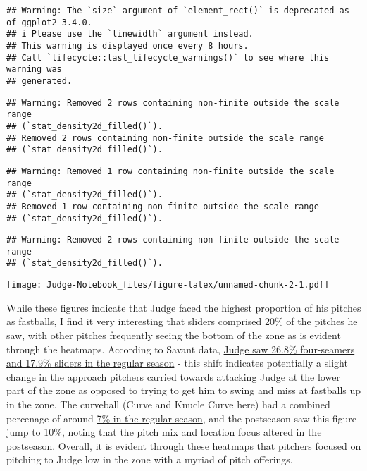 \documentclass[
]{article}
\begin{document}
\begin{verbatim}
## Warning: The `size` argument of `element_rect()` is deprecated as of ggplot2 3.4.0.
## i Please use the `linewidth` argument instead.
## This warning is displayed once every 8 hours.
## Call `lifecycle::last_lifecycle_warnings()` to see where this warning was
## generated.
\end{verbatim}

\begin{verbatim}
## Warning: Removed 2 rows containing non-finite outside the scale range
## (`stat_density2d_filled()`).
## Removed 2 rows containing non-finite outside the scale range
## (`stat_density2d_filled()`).
\end{verbatim}

\begin{verbatim}
## Warning: Removed 1 row containing non-finite outside the scale range
## (`stat_density2d_filled()`).
## Removed 1 row containing non-finite outside the scale range
## (`stat_density2d_filled()`).
\end{verbatim}

\begin{verbatim}
## Warning: Removed 2 rows containing non-finite outside the scale range
## (`stat_density2d_filled()`).
\end{verbatim}

\texttt{[image: Judge-Notebook\_files/figure-latex/unnamed-chunk-2-1.pdf]}

While these figures indicate that Judge faced the highest proportion of
his pitches as fastballs, I find it very interesting that sliders
comprised 20\% of the pitches he saw, with other pitches frequently
seeing the bottom of the zone as is evident through the heatmaps.
According to Savant data,
\href{https://baseballsavant.mlb.com/savant-player/aaron-judge-592450?stats=statcast-r-hitting-mlb}{Judge
saw 26.8\% four-seamers and 17.9\% sliders in the regular season} - this
shift indicates potentially a slight change in the approach pitchers
carried towards attacking Judge at the lower part of the zone as opposed
to trying to get him to swing and miss at fastballs up in the zone. The
curveball (Curve and Knucle Curve here) had a combined percenage of
around
\href{https://baseballsavant.mlb.com/savant-player/aaron-judge-592450?stats=statcast-r-hitting-mlb}{7\%
in the regular season}, and the postseason saw this figure jump to 10\%,
noting that the pitch mix and location focus altered in the postseason.
Overall, it is evident through these heatmaps that pitchers focused on
pitching to Judge low in the zone with a myriad of pitch offerings.
\end{document}

